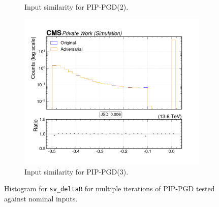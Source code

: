 \begin{figure}[htbp]
\begin{subfigure}[t]{0.32\textwidth}
    \caption*{Input similarity for PIP-PGD(2).}
  \end{subfigure}\hfill
  \begin{subfigure}[t]{0.32\textwidth}
    \includegraphics[width=\linewidth]{media/output/features/compare/combined_it_3/cmp_vtx_arr_sv_deltaR.pdf}
    \caption*{Input similarity for PIP-PGD(3).}
  \end{subfigure}

  \caption*{Histogram for \texttt{sv\_deltaR} for multiple iterations of PIP-PGD tested against nominal inputs.}
  \label{fig:combined_input_sv_deltaR}
\end{figure}

